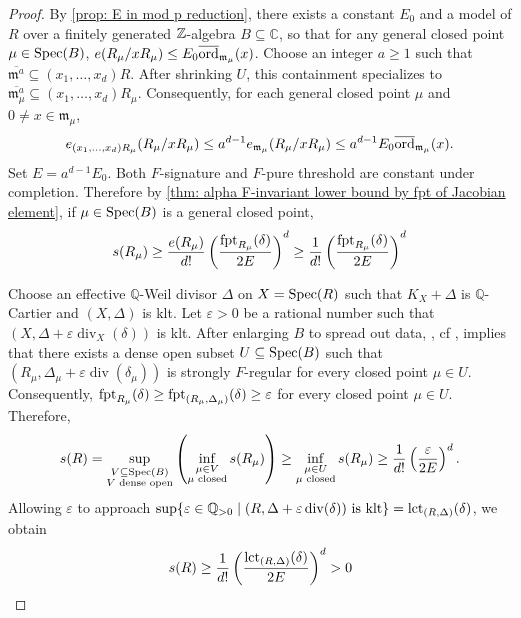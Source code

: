 \documentclass[12pt]{amsart}
\numberwithin{equation}{theorem}
\theoremstyle{plain}
\newcommand{\fm}{\mathfrak{m}}
\newcommand{\QQ}{\mathbb{Q}}
\newcommand{\CC}{\mathbb{C}}
\DeclareMathOperator{\lct}{lct}
\begin{document}
\begin{proof}
    By \cref{prop: E in mod p reduction}, there exists a constant $E_0$ and a model of $R$ over a finitely generated $\mbox{$\mathbb{Z}$}$-algebra $B\subseteq \CC$, so that for any general closed point $\mu \in \operatorname{{Spec}}(B)$, $e(R_\mu/xR_{\mu})\leq E_0\overline{\ord}_{\fm_\mu}(x)$. Choose an integer $a\geq 1$ such that $\overline{\fm^a}\subseteq (x_1,\ldots,x_d)R$. After shrinking $U$, this containment specializes to $\overline{\fm_\mu^a}\subseteq (x_1,\ldots,x_d)R_\mu$. Consequently, for each general closed point $\mu$ and $0\not=x\in \fm_{\mu}$, 
    \[
    e_{(x_1,\ldots,x_d)R_\mu}(R_\mu/xR_\mu) \leq a^{d-1}e_{\fm_\mu}(R_\mu/xR_\mu) \leq a^{d-1}E_0\overline{\ord}_{\fm_\mu}(x).
    \]
    Set $E=a^{d-1}E_0$. Both $F$-signature and $F$-pure threshold are constant under completion. Therefore by \cref{thm: alpha F-invariant lower bound by fpt of Jacobian element}, if $\mu \in \operatorname{{Spec}}(B)$ is a general closed point,
    \[
    s(R_{\mu}) \geq \frac{e(R_{\mu})}{d!}\left(\frac{\operatorname{{fpt}}_{R_{\mu}}(\delta)}{2E}\right)^d \geq \frac{1}{d!}\left(\frac{\operatorname{{fpt}}_{R_{\mu}}(\delta)}{2E}\right)^d
    \]

    
    Choose an effective $\QQ$-Weil divisor $\Delta$ on $X=\operatorname{{Spec}}(R)$ such that $K_X+\Delta$ is $\QQ$-Cartier and $(X,\Delta)$ is klt. Let $\varepsilon>0$ be a rational number such that $(X,\Delta+\varepsilon\operatorname{div}_X(\delta))$ is klt. After enlarging $B$ to spread out data, \cite[Corollary~3.4]{Takagi2004}, cf \cite[Corollary~6.6]{CEMS18}, implies that there exists a dense open subset $U\subseteq\operatorname{{Spec}}(B)$ such that $\left(R_\mu,\Delta_\mu+ \varepsilon\operatorname{div}(\delta_\mu)\right)$ is strongly $F$-regular for every closed point $\mu\in U$. Consequently, $\operatorname{{fpt}}_{R_\mu}(\delta)\geq \operatorname{{fpt}}_{(R_\mu,\Delta_\mu)}(\delta)\geq \varepsilon$ for every closed point $\mu\in U$. Therefore, 
    \[
    s(R) = \sup_{\substack{V\subseteq\operatorname{{Spec}}(B)\\ V\text{ dense open}}}\left(\inf_{\substack{\mu\in V\\ \mu\text{ closed}}}s(R_\mu)\right)\geq\inf_{\substack{\mu\in U\\ \mu\text{ closed}}}s(R_\mu)\geq\frac{1}{d!}\left(\frac{\varepsilon}{2E}\right)^d.
    \]
    Allowing $\varepsilon$ to approach $\sup\{\varepsilon\in \QQ_{>0}\mid (R,\Delta + \varepsilon \Div(\delta))\mbox{ is klt}\} = \lct_{(R,\Delta)}(\delta)$, we obtain
    \[
    s(R)\geq \frac{1}{d!}\left(\frac{\lct_{(R,\Delta)}(\delta)}{2E}\right)^d>0 \qedhere
    \]
\end{proof}
\end{document}
